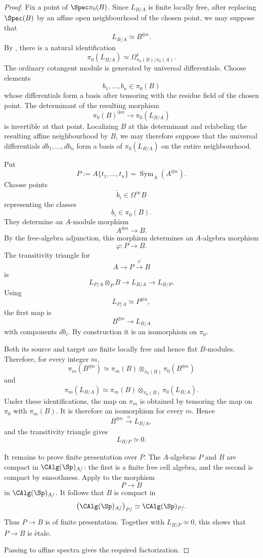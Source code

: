 \begin{proof}
Fix a point of $\Spec\pi_0(B)$. Since $L_{B/A}$ is finite locally free,
after replacing $\Spec(B)$ by an affine open neighbourhood of the chosen
point, we may suppose that
\[
    L_{B/A}
    \simeq
    B^{\oplus n}.
\]
By , there is a natural
identification
\[
    \pi_0(L_{B/A})
    \simeq
    \Omega^1_{\pi_0(B)/\pi_0(A)}.
\]
The ordinary cotangent module is generated by universal differentials.
Choose elements
\[
    b_1,\ldots,b_n
    \in
    \pi_0(B)
\]
whose differentials form a basis after tensoring with the residue field of
the chosen point. The determinant of the resulting morphism
\[
    \pi_0(B)^{\oplus n}
    \longrightarrow
    \pi_0(L_{B/A})
\]
is invertible at that point. Localizing $B$ at this determinant and
relabeling the resulting affine neighbourhood by $B$, we may therefore
suppose that the universal differentials $db_1,\ldots,db_n$ form a basis
of $\pi_0(L_{B/A})$ on the entire neighbourhood.

Put
\[
    P
    :=
    A\{t_1,\ldots,t_n\}
    =
    \operatorname{Sym}_A(A^{\oplus n}).
\]
Choose points
\[
    \widetilde b_i
    \in
    \Omega^\infty B
\]
representing the classes
\[
    b_i
    \in
    \pi_0(B).
\]
They determine an $A$-module morphism
\[
    A^{\oplus n}
    \longrightarrow
    B.
\]
By the free-algebra adjunction, this morphism determines an
$A$-algebra morphism
\[
    \varphi
    \colon
    P
    \longrightarrow
    B.
\]
The transitivity triangle for
\[
    A
    \longrightarrow
    P
    \xrightarrow{\varphi}
    B
\]
is
\[
    L_{P/A}\otimes_PB
    \longrightarrow
    L_{B/A}
    \longrightarrow
    L_{B/P}.
\]
Using
\[
    L_{P/A}
    \simeq
    P^{\oplus n},
\]
the first map is
\[
    B^{\oplus n}
    \longrightarrow
    L_{B/A}
\]
with components $db_i$. By construction it is an isomorphism on
$\pi_0$.

Both its source and target are finite locally free and hence flat
$B$-modules. Therefore, for every integer $m$,
\[
    \pi_m(B^{\oplus n})
    \simeq
    \pi_m(B)
    \otimes_{\pi_0(B)}
    \pi_0(B^{\oplus n})
\]
and
\[
    \pi_m(L_{B/A})
    \simeq
    \pi_m(B)
    \otimes_{\pi_0(B)}
    \pi_0(L_{B/A}).
\]
Under these identifications, the map on $\pi_m$ is obtained by tensoring
the map on $\pi_0$ with $\pi_m(B)$. It is therefore an isomorphism for
every $m$. Hence
\[
    B^{\oplus n}
    \xrightarrow{\simeq}
    L_{B/A},
\]
and the transitivity triangle gives
\[
    L_{B/P}
    \simeq
    0.
\]

It remains to prove finite presentation over $P$. The $A$-algebras $P$
and $B$ are compact in $\CAlg(\Sp)_{A/}$: the first is a finite free cell
algebra, and the second is compact by smoothness. Apply
 to the morphism
\[
    P
    \longrightarrow
    B
\]
in $\CAlg(\Sp)_{A/}$. It follows that $B$ is compact in
\[
    \bigl(\CAlg(\Sp)_{A/}\bigr)_{P/}
    \simeq
    \CAlg(\Sp)_{P/}.
\]
Thus $P\to B$ is of finite presentation. Together with
$L_{B/P}\simeq0$, this shows that $P\to B$ is \`etale.

Passing to affine spectra gives the required factorization.
\end{proof}

